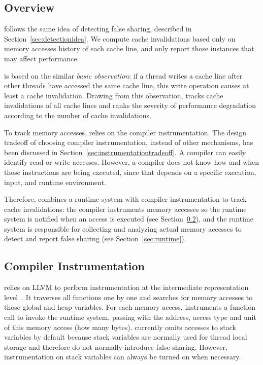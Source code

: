 \label{sec:detection}

\subsection{Overview}
\label{sec:overview}
\Predator{} follows the same idea of detecting false sharing, described in Section~\ref{sec:detectionidea}. We compute cache invalidations based only on memory accesses history of each cache line, and only report those instances that may affect performance. 

\Predator{} is based on the similar {\it basic observation}: if a thread writes a cache line after other threads have accessed the same cache line, this write operation causes at least a cache invalidation. Drawing from this observation, \Predator{} tracks cache invalidations of all cache lines and ranks the severity of performance degradation  according to the number of cache invalidations. 
 
To track memory accesses, \Predator{} relies on the compiler instrumentation. The design tradeoff of choosing compiler instrumentation, instead of other mechanisms, has been discussed in Section~\ref{sec:instrumentationtradeoff}. A compiler can easily identify read or write accesses. However, a compiler does not know how and when those instructions are being executed, since that depends on a specific execution, input, and runtime environment.

Therefore, \Predator{} combines a runtime system with compiler instrumentation to track cache invalidations: the compiler instruments memory accesses so the runtime system is notified when an access is executed (see Section~\ref{sec:compiler}), and the runtime system is responsible for collecting and analyzing actual memory accesses to detect and report false sharing (see Section~\ref{sec:runtime}).

\subsection{Compiler Instrumentation}
\label{sec:compiler}

\Predator{} relies on LLVM to perform instrumentation at the intermediate representation level~\cite{llvm}.
It traverses all functions one by one and searches for memory accesses to those global and heap variables.  For each memory access, \Predator{} instruments a function call to invoke the runtime system, passing with the address, access type and unit of this memory access (how many bytes). \Predator{} currently omits accesses to stack variables by default because stack variables are normally used for thread local storage and therefore do not normally introduce false sharing. However, instrumentation on stack variables
can always be turned on when necessary.

